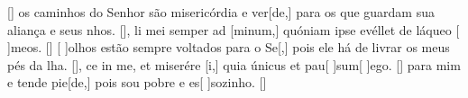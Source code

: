 {{            [\LinkLA]}%
        { os caminhos do Senhor são misericórdia e ver[de,] para os que guardam sua aliança e seus nhos. [\LinkPT]},
    {li mei semper ad [minum,] quóniam ipse
            evéllet de láqueo [ ]{me}os. [\LinkLA]}%
        {[ ]{o}lhos estão sempre voltados para o Se[,] pois ele há de livrar os meus pés da lha. [\LinkPT]},
    {ce in me, et miserére [i,] quia únicus et pau[ ]{sum}[ ]{e}go. [\LinkLA]}%
        { para mim e tende pie[de,] pois sou pobre e es[ ]{so}{zi}nho. [\LinkPT]}
}